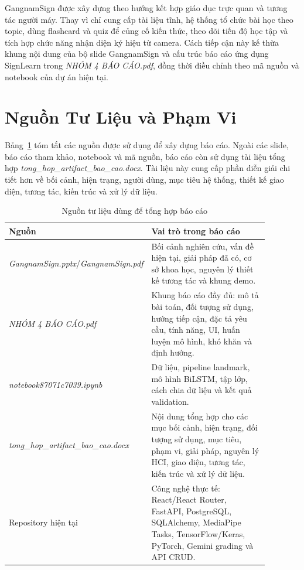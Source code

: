 \documentclass[conference]{IEEEtran}
\begin{document}
GangnamSign được xây dựng theo hướng kết hợp giáo dục trực quan và tương tác người máy. Thay vì chỉ cung cấp tài liệu tĩnh, hệ thống tổ chức bài học theo topic, dùng flashcard và quiz để củng cố kiến thức, theo dõi tiến độ học tập và tích hợp chức năng nhận diện ký hiệu từ camera. Cách tiếp cận này kế thừa khung nội dung của bộ slide GangnamSign và cấu trúc báo cáo ứng dụng SignLearn trong \textit{NHÓM 4 BÁO CÁO.pdf}, đồng thời điều chỉnh theo mã nguồn và notebook của dự án hiện tại.

\section{Nguồn Tư Liệu và Phạm Vi}
Bảng~\ref{tab:sources} tóm tắt các nguồn được sử dụng để xây dựng báo cáo. Ngoài các slide, báo cáo tham khảo, notebook và mã nguồn, báo cáo còn sử dụng tài liệu tổng hợp \textit{tong\_hop\_artifact\_bao\_cao.docx}. Tài liệu này cung cấp phần diễn giải chi tiết hơn về bối cảnh, hiện trạng, người dùng, mục tiêu hệ thống, thiết kế giao diện, tương tác, kiến trúc và xử lý dữ liệu.

\begin{table}[htbp]
\caption{Nguồn tư liệu dùng để tổng hợp báo cáo}
\begin{center}
\footnotesize
\begin{tabular}{|p{0.31\linewidth}|p{0.57\linewidth}|}
\hline
\textbf{Nguồn} & \textbf{Vai trò trong báo cáo} \\
\hline
\textit{GangnamSign.pptx}/\textit{GangnamSign.pdf} & Bối cảnh nghiên cứu, vấn đề hiện tại, giải pháp đã có, cơ sở khoa học, nguyên lý thiết kế tương tác và khung demo. \\
\hline
\textit{NHÓM 4 BÁO CÁO.pdf} & Khung báo cáo đầy đủ: mô tả bài toán, đối tượng sử dụng, hướng tiếp cận, đặc tả yêu cầu, tính năng, UI, huấn luyện mô hình, khó khăn và định hướng. \\
\hline
\textit{notebook87071c7039.ipynb} & Dữ liệu, pipeline landmark, mô hình BiLSTM, tập lớp, cách chia dữ liệu và kết quả validation. \\
\hline
\textit{tong\_hop\_artifact\_bao\_cao.docx} & Nội dung tổng hợp cho các mục bối cảnh, hiện trạng, đối tượng sử dụng, mục tiêu, phạm vi, giải pháp, nguyên lý HCI, giao diện, tương tác, kiến trúc và xử lý dữ liệu. \\
\hline
Repository hiện tại & Công nghệ thực tế: React/React Router, FastAPI, PostgreSQL, SQLAlchemy, MediaPipe Tasks, TensorFlow/Keras, PyTorch, Gemini grading và API CRUD. \\
\hline
\end{tabular}
\label{tab:sources}
\end{center}
\end{table}
\end{document}
